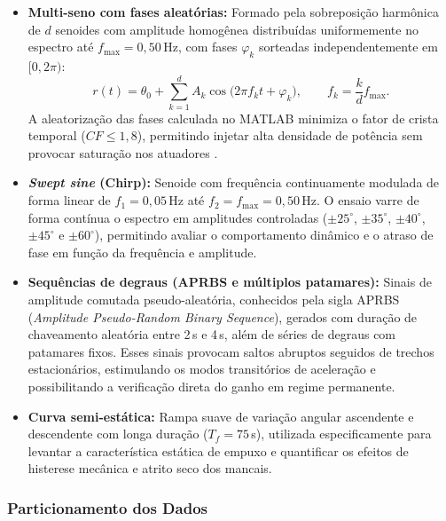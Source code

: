\begin{itemize}
    \item \textbf{Multi-seno com fases aleatórias:} Formado pela sobreposição harmônica de $d$ senoides com amplitude homogênea distribuídas uniformemente no espectro até $f_{\max} = 0{,}50$\,Hz, com fases $\varphi_k$ sorteadas independentemente em $[0, 2\pi)$:
    \begin{equation}
        r(t) = \theta_0 + \sum_{k=1}^{d} A_k \cos\!\bigl(2\pi f_k t + \varphi_k\bigr), \qquad f_k = \frac{k}{d} f_{\max}.
    \end{equation}
    A aleatorização das fases calculada no MATLAB minimiza o fator de crista temporal ($CF \le 1{,}8$), permitindo injetar alta densidade de potência sem provocar saturação nos atuadores \cite{ljung1999}.
    
    \item \textbf{\textit{Swept sine} (Chirp):} Senoide com frequência continuamente modulada de forma linear de $f_1 = 0{,}05$\,Hz até $f_2 = f_{\max} = 0{,}50$\,Hz. O ensaio varre de forma contínua o espectro em amplitudes controladas ($\pm 25^\circ$, $\pm 35^\circ$, $\pm 40^\circ$, $\pm 45^\circ$ e $\pm 60^\circ$), permitindo avaliar o comportamento dinâmico e o atraso de fase em função da frequência e amplitude.
    
    \item \textbf{Sequências de degraus (APRBS e múltiplos patamares):} Sinais de amplitude comutada pseudo-aleatória, conhecidos pela sigla APRBS (\textit{Amplitude Pseudo-Random Binary Sequence}), gerados com duração de chaveamento aleatória entre 2\,s e 4\,s, além de séries de degraus com patamares fixos. Esses sinais provocam saltos abruptos seguidos de trechos estacionários, estimulando os modos transitórios de aceleração e possibilitando a verificação direta do ganho em regime permanente.
    
    \item \textbf{Curva semi-estática:} Rampa suave de variação angular ascendente e descendente com longa duração ($T_f = 75$\,s), utilizada especificamente para levantar a característica estática de empuxo e quantificar os efeitos de histerese mecânica e atrito seco dos mancais.
\end{itemize}

\subsubsection{Particionamento dos Dados}
\label{subsec:divisao_dados}

